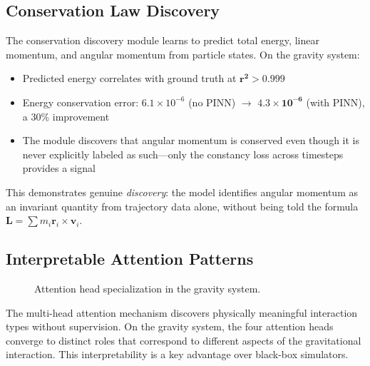 \documentclass[11pt,a4paper]{article}
\begin{document}
\subsection{Conservation Law Discovery}

The conservation discovery module learns to predict total energy, linear momentum, and angular momentum from particle states. On the gravity system:
\begin{itemize}[leftmargin=*]
    \item Predicted energy correlates with ground truth at $\mathbf{r^2 > 0.999}$
    \item Energy conservation error: $6.1 \times 10^{-6}$ (no PINN) $\to$ $\mathbf{4.3 \times 10^{-6}}$ (with PINN), a 30\% improvement
    \item The module discovers that angular momentum is conserved even though it is never explicitly labeled as such---only the constancy loss across timesteps provides a signal
\end{itemize}

This demonstrates genuine \emph{discovery}: the model identifies angular momentum as an invariant quantity from trajectory data alone, without being told the formula $\mathbf{L} = \sum m_i \mathbf{r}_i \times \mathbf{v}_i$.

\subsection{Interpretable Attention Patterns}

\begin{figure}[H]
\centering
{}
\caption{Attention head specialization in the gravity system.}
\label{fig:attention}
\end{figure}

The multi-head attention mechanism discovers physically meaningful interaction types without supervision. On the gravity system, the four attention heads converge to distinct roles that correspond to different aspects of the gravitational interaction. This interpretability is a key advantage over black-box simulators.
\end{document}
